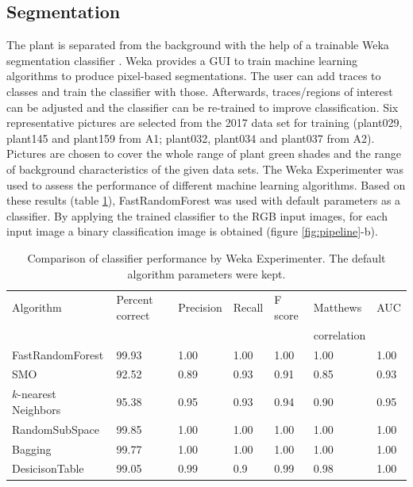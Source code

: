 \documentclass[paper=A4,bibliography=totocnumbered]{scrartcl}
\begin{document}
\subsection{Segmentation}
The plant is separated from the background with the help of a trainable Weka segmentation classifier \citep{ArgandaCarreras.2017}. Weka provides a GUI to train machine learning algorithms to produce pixel-based segmentations. The user can add traces to classes and train the classifier with those. Afterwards, traces/regions of interest can be adjusted and the classifier can be re-trained to improve classification. Six representative pictures are selected from the 2017 data set for training (plant029, plant145 and plant159 from A1; plant032, plant034 and plant037 from A2). Pictures are chosen to cover the whole range of plant green shades and the range of background characteristics of the given data sets. The Weka Experimenter was used to assess the performance of different machine learning algorithms. Based on these results (table \ref{tab:weka}), FastRandomForest was used with default parameters as a classifier. By applying the trained classifier to the RGB input images, for each input image a binary classification image is obtained (figure \ref{fig:pipeline}-b). 

\begin{table}[htbp]
	\centering
	\caption{Comparison of classifier performance by Weka Experimenter. The default algorithm parameters were kept.}
	\begin{tabular}{lllllll}
		\toprule
		Algorithm & Percent correct & Precision & Recall & F score & Matthews  & AUC \\
		 & & & & & correlation & \\
		 \midrule
		FastRandomForest & 99.93 & 1.00 & 1.00 & 1.00 & 1.00 & 1.00 \\
		SMO & 92.52 & 0.89 & 0.93 & 0.91 & 0.85 & 0.93 \\
		$k$-nearest Neighbors & 95.38 & 0.95 & 0.93 & 0.94 & 0.90 & 0.95 \\
		RandomSubSpace & 99.85 & 1.00 & 1.00 & 1.00 & 1.00 & 1.00 \\
		Bagging & 99.77 & 1.00 & 1.00 & 1.00 & 1.00 & 1.00 \\
		DesicisonTable & 99.05 & 0.99 & 0.9 & 0.99 & 0.98 & 1.00 \\
		\bottomrule
	\end{tabular}
	\label{tab:weka}
\end{table}
\end{document}
